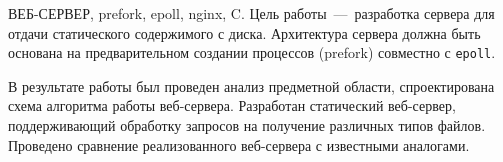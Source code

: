 \begin{essay}{ВЕБ-СЕРВЕР, prefork, epoll, nginx, C.}
	Цель работы~---~разработка сервера для отдачи статического содержимого с диска.
	Архитектура сервера должна быть основана на предварительном создании процессов (prefork) совместно с \texttt{epoll}.
	
	В результате работы был проведен анализ предметной области, спроектирована схема алгоритма работы веб-сервера.
	Разработан статический веб-сервер, поддерживающий обработку запросов на получение различных типов файлов.
	Проведено сравнение реализованного веб-сервера с известными аналогами.
\end{essay}
